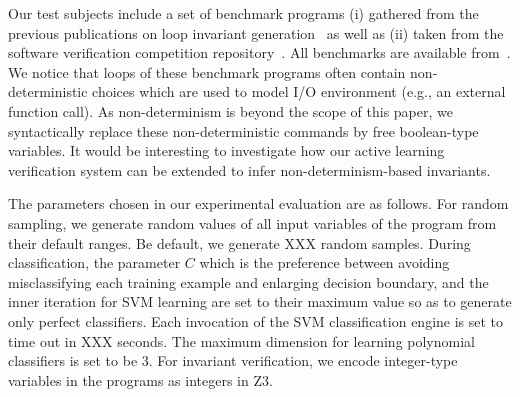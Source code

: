 Our test subjects include a set of benchmark programs %
(i) gathered from
 the previous publications on loop invariant generation~\cite{???}  as well as
 (ii)
taken  from
 the software verification competition repository~\cite{Dirk:SVCOMP:2016}.
All benchmarks are available from~\cite{zilu}.
We notice that loops of these benchmark programs often contain non-deterministic choices
which are used to model I/O environment (e.g., an external function call).
As non-determinism is beyond the scope of this paper,
we syntactically replace these non-deterministic commands by  free boolean-type variables.
It would be interesting to investigate how
 our active learning verification system can be extended
to infer non-determinism-based invariants.

The parameters chosen in our experimental evaluation are as follows.
For random sampling, we generate random values of all input variables of the program from their default ranges. Be default, we generate XXX random samples. 
During classification, the parameter $C$ which is the preference between avoiding misclassifying each training example and enlarging decision boundary,
and the inner iteration for SVM learning are set to their maximum value so as to generate only perfect classifiers. Each invocation of the SVM classification engine is set to time out in XXX seconds. The maximum dimension for learning polynomial classifiers is set to be 3. For invariant verification, we encode integer-type variables in the programs as integers in Z3. 


